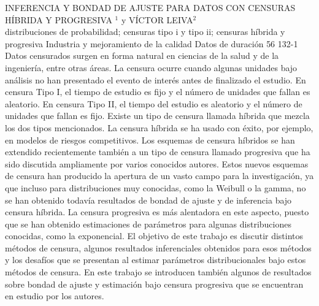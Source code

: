 \A
{INFERENCIA Y BONDAD DE AJUSTE PARA DATOS CON CENSURAS HÍBRIDA Y PROGRESIVA}
{$^1$ y VÍCTOR LEIVA$^2$}
{
\\}
{distribuciones de probabilidad; censuras tipo i y tipo ii; censuras híbrida y progresiva} 
 {Industria y mejoramiento de la calidad} 
 {Datos de duración} 
 {56} 
 {132-1}
{Datos censurados surgen en forma natural en ciencias de la salud y de la ingeniería, entre otras áreas. La censura ocurre cuando algunas unidades bajo análisis no han presentado el evento de interés antes de finalizado el estudio. En censura Tipo I, el tiempo de estudio es fijo y el número de unidades que fallan es aleatorio. En censura Tipo II, el tiempo del estudio es aleatorio y el número de unidades que fallan es fijo. Existe un tipo de censura llamada híbrida que mezcla los dos tipos mencionados. La censura híbrida se ha usado con éxito, por ejemplo, en modelos de riesgos competitivos. Los esquemas de censura híbridos se han extendido recientemente también a un tipo de censura llamado progresiva que ha sido discutida ampliamente por varios conocidos autores. Estos nuevos esquemas de censura han producido la apertura de un vasto campo para la investigación, ya que incluso para distribuciones muy conocidas, como la Weibull o la gamma, no se han obtenido todavía resultados de bondad de ajuste y de inferencia bajo censura híbrida. La censura progresiva es más alentadora en este aspecto, puesto que se han obtenido estimaciones de parámetros para algunas distribuciones conocidas, como la exponencial. El objetivo de este trabajo es discutir distintos métodos de censura, algunos resultados inferenciales obtenidos para esos métodos y los desafíos que se presentan al estimar parámetros distribucionales bajo estos métodos de censura. En este trabajo se introducen también algunos de resultados sobre bondad de ajuste y estimación bajo censura progresiva que se encuentran en estudio por los autores. }
